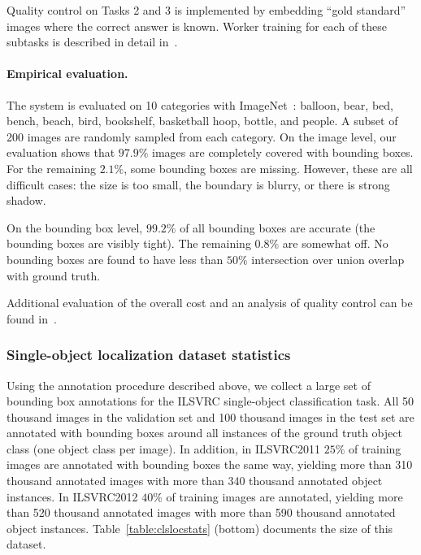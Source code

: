 \begin{table}
Quality control on Tasks 2 and 3 is implemented by embedding ``gold standard'' images where the correct answer is known. Worker training for each of these subtasks is described in detail in~\citep{Su12}.

\paragraph{Empirical evaluation.} The system is evaluated on 10 categories with ImageNet~\citep{ImageNet}:  balloon, bear, bed, bench, beach, bird, bookshelf, basketball hoop, bottle, and people. A subset of 200 images are randomly sampled from each category. On the image level, our evaluation shows that $97.9\%$ images are completely covered with bounding boxes. For the remaining $2.1\%$, some bounding boxes are missing. However, these are all difficult cases: the size is too small, the boundary is blurry, or there is strong shadow.

On the bounding box level, $99.2\%$ of all bounding boxes are accurate (the bounding boxes are visibly tight). The remaining $0.8\%$ are somewhat off. No bounding boxes are found to have less than $50\%$ intersection over union overlap with ground truth.

Additional evaluation of the overall cost and an analysis of quality control can be found in~\citep{Su12}.



\subsubsection{Single-object localization dataset statistics}
\label{sec:LocStats}

Using the annotation procedure described above, we collect a large set of bounding box annotations
for the ILSVRC single-object classification task. All 50 thousand images in the validation set and
100 thousand images in the test set are annotated with bounding boxes around all instances of the
ground truth object class (one object class per image). In addition, in ILSVRC2011 
$25\%$ of training images are annotated with bounding boxes the same way, yielding more than 310 thousand
annotated images with more than 340 thousand annotated object instances. In ILSVRC2012 $40\%$ of
training images are annotated, yielding more than 520 thousand 
annotated images with more than 590 thousand annotated object instances. 
Table~\ref{table:clslocstats} (bottom) documents the size of this dataset.


\end{table}
